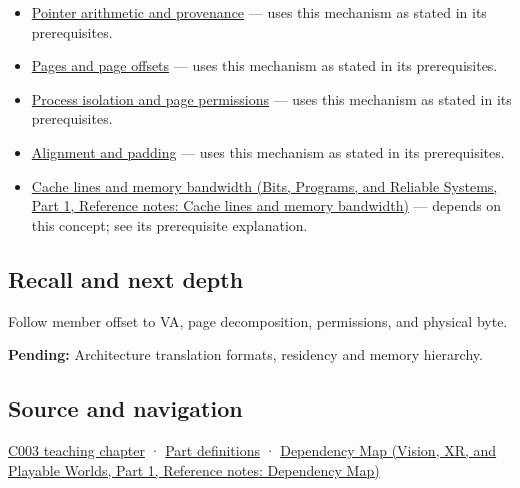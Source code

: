 \hypertarget{appendix-18ee4f913c3c-used-by}{}

\begin{itemize}
\item
  \hyperref[appendix-6af5921bc853]{Pointer arithmetic and provenance} --- uses this mechanism as stated in its prerequisites.
\item
  \hyperref[appendix-0c67cd5bf30a]{Pages and page offsets} --- uses this mechanism as stated in its prerequisites.
\item
  \hyperref[appendix-c2a9ad1e2b49]{Process isolation and page permissions} --- uses this mechanism as stated in its prerequisites.
\item
  \hyperref[appendix-a1f7c53b4742]{Alignment and padding} --- uses this mechanism as stated in its prerequisites.
\item
  \href{../01-Bits-Programs-and-Reliable-Systems-P01/main.pdf\#appendix-e4ccdbab8320}{Cache lines and memory bandwidth (Bits, Programs, and Reliable Systems, Part 1, Reference notes: Cache lines and memory bandwidth)} --- depends on this concept; see its prerequisite explanation.
\end{itemize}

\subsection{Recall and next depth}\label{appendix-18ee4f913c3c-recall-and-next-depth}

\hypertarget{appendix-18ee4f913c3c-recall-and-next-depth}{}

Follow member offset to VA, page decomposition, permissions, and physical byte.

\textbf{Pending:} Architecture translation formats, residency and memory hierarchy.

\subsection{Source and navigation}\label{appendix-18ee4f913c3c-source-and-navigation}

\hypertarget{appendix-18ee4f913c3c-source-and-navigation}{}

\hyperref[01-foundations-i-ch002-where-the-bytes-live]{C003 teaching chapter} · \hyperref[appendix-fd090d982a15-m003---parts-41-60]{Part definitions} · \href{../07-Vision-XR-and-Playable-Worlds-P01/main.pdf\#appendix-4ad47bdd269a}{Dependency Map (Vision, XR, and Playable Worlds, Part 1, Reference notes: Dependency Map)}
